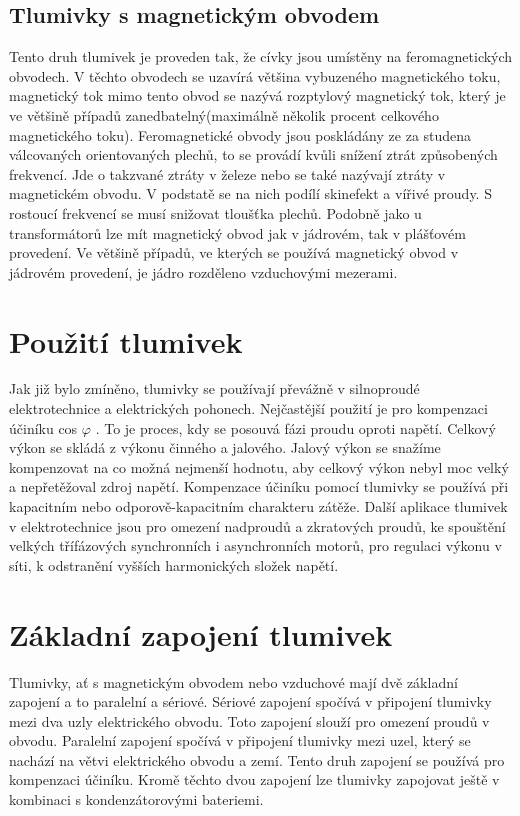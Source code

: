 \subsection{Tlumivky s magnetickým obvodem}
Tento druh tlumivek je proveden tak, že cívky jsou umístěny na feromagnetických obvodech. V těchto obvodech se uzavírá většina vybuzeného magnetického toku, magnetický tok mimo tento obvod se nazývá rozptylový magnetický tok, který je ve většině případů zanedbatelný(maximálně několik procent celkového magnetického toku). Feromagnetické obvody jsou poskládány ze za studena válcovaných orientovaných plechů, to se provádí kvůli snížení ztrát způsobených frekvencí. Jde o takzvané ztráty v železe nebo se také nazývají ztráty v magnetickém obvodu. V podstatě se na nich podílí skinefekt a vířivé proudy. S rostoucí frekvencí se musí snižovat tloušťka plechů. Podobně jako u transformátorů lze mít magnetický obvod jak v jádrovém, tak v plášťovém provedení. Ve většině případů, ve kterých se používá magnetický obvod v jádrovém provedení, je jádro rozděleno vzduchovými mezerami.

\section{Použití tlumivek}
Jak již bylo zmíněno, tlumivky se používají převážně v silnoproudé elektrotechnice a elektrických pohonech. Nejčastější použití je pro kompenzaci účiníku cos $\varphi$ . To je proces, kdy se posouvá fázi proudu oproti napětí. Celkový výkon se skládá z výkonu činného a jalového. Jalový výkon se snažíme kompenzovat na co možná nejmenší hodnotu, aby celkový výkon nebyl moc velký a nepřetěžoval zdroj napětí. Kompenzace účiníku pomocí tlumivky se používá při kapacitním nebo odporově-kapacitním charakteru zátěže. Další aplikace tlumivek v elektrotechnice jsou pro omezení nadproudů a zkratových proudů, ke spouštění velkých třífázových synchronních i asynchronních motorů, pro regulaci výkonu v síti, k odstranění vyšších harmonických složek napětí.

\section{Základní zapojení tlumivek} Tlumivky, ať s magnetickým obvodem nebo vzduchové mají dvě základní zapojení a to paralelní a sériové. Sériové zapojení spočívá v připojení tlumivky mezi dva uzly elektrického obvodu. Toto zapojení slouží pro omezení proudů v obvodu. Paralelní zapojení spočívá  v připojení tlumivky mezi uzel, který se nachází na větvi elektrického obvodu a zemí. Tento druh zapojení se používá pro kompenzaci účiníku. Kromě těchto dvou zapojení lze tlumivky zapojovat ještě v kombinaci s kondenzátorovými bateriemi.